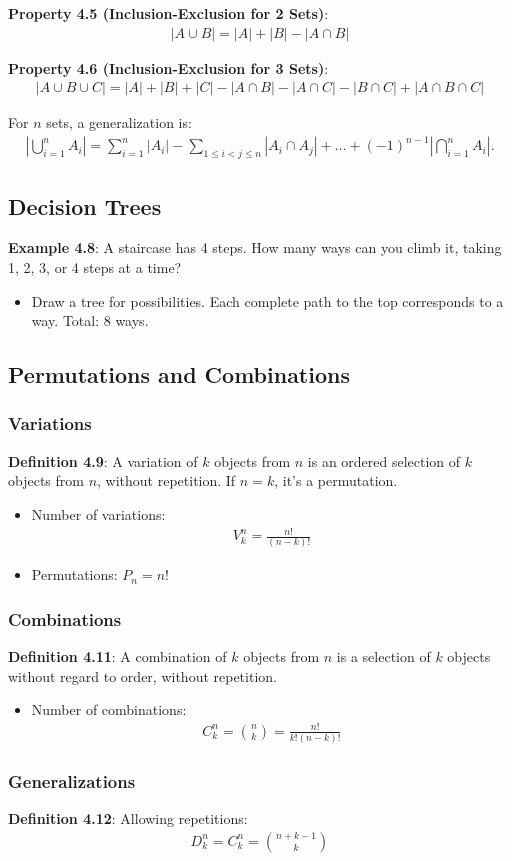 \textbf{Property 4.5 (Inclusion-Exclusion for 2 Sets)}:
\begin{align*}
    |A \cup B| = |A| + |B| - |A \cap B|
\end{align*}

\textbf{Property 4.6 (Inclusion-Exclusion for 3 Sets)}:
\begin{align*}
    |A \cup B \cup C| = |A| + |B| + |C| - |A \cap B| - |A \cap C| - |B \cap C| + |A \cap B \cap C|
\end{align*}

For $n$ sets, a generalization is:
\begin{align*}
    \left| \bigcup_{i=1}^n A_i \right| = \sum_{i=1}^n |A_i| - \sum_{1 \leq i < j \leq n} |A_i \cap A_j| + \dots + (-1)^{n-1} \left| \bigcap_{i=1}^n A_i \right|.
\end{align*}

\subsection{Decision Trees}

\textbf{Example 4.8}: A staircase has 4 steps. How many ways can you climb it, taking 1, 2, 3, or 4 steps at a time?
\begin{itemize}
    \item Draw a tree for possibilities. Each complete path to the top corresponds to a way. Total: 8 ways.
\end{itemize}

\subsection{Permutations and Combinations}

\subsubsection*{Variations}
\textbf{Definition 4.9}: A variation of $k$ objects from $n$ is an ordered selection of $k$ objects from $n$, without repetition. If $n = k$, it’s a permutation.
\begin{itemize}
    \item Number of variations:
    \begin{align*}
        V_k^n = \frac{n!}{(n-k)!}
    \end{align*}
    \item Permutations: $P_n = n!$
\end{itemize}

\subsubsection*{Combinations}
\textbf{Definition 4.11}: A combination of $k$ objects from $n$ is a selection of $k$ objects without regard to order, without repetition.
\begin{itemize}
    \item Number of combinations:
    \begin{align*}
        C_k^n = \binom{n}{k} = \frac{n!}{k!(n-k)!}
    \end{align*}
\end{itemize}

\subsubsection*{Generalizations}
\textbf{Definition 4.12}: Allowing repetitions:
\begin{align*}
    D_k^n = C_k^n = \binom{n+k-1}{k}
\end{align*}
